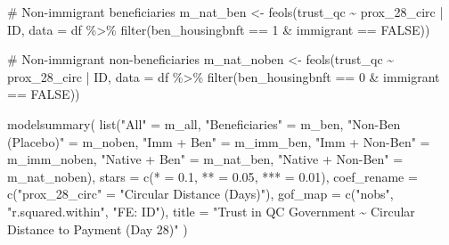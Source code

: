 \documentclass[
  letterpaper,
  DIV=11,
  numbers=noendperiod]{scrartcl}
\newenvironment{Shaded}{\begin{snugshade}}{\end{snugshade}}
\newcommand{\AttributeTok}[1]{\textcolor[rgb]{0.40,0.45,0.13}{#1}}
\newcommand{\CommentTok}[1]{\textcolor[rgb]{0.37,0.37,0.37}{#1}}
\newcommand{\ConstantTok}[1]{\textcolor[rgb]{0.56,0.35,0.01}{#1}}
\newcommand{\DecValTok}[1]{\textcolor[rgb]{0.68,0.00,0.00}{#1}}
\newcommand{\FloatTok}[1]{\textcolor[rgb]{0.68,0.00,0.00}{#1}}
\newcommand{\FunctionTok}[1]{\textcolor[rgb]{0.28,0.35,0.67}{#1}}
\newcommand{\NormalTok}[1]{\textcolor[rgb]{0.00,0.23,0.31}{#1}}
\newcommand{\OtherTok}[1]{\textcolor[rgb]{0.00,0.23,0.31}{#1}}
\newcommand{\SpecialCharTok}[1]{\textcolor[rgb]{0.37,0.37,0.37}{#1}}
\newcommand{\StringTok}[1]{\textcolor[rgb]{0.13,0.47,0.30}{#1}}
\begin{document}
\begin{Shaded}
\begin{Highlighting}[]
\CommentTok{\# Non{-}immigrant beneficiaries}
\NormalTok{m\_nat\_ben }\OtherTok{\textless{}{-}} \FunctionTok{feols}\NormalTok{(trust\_qc }\SpecialCharTok{\textasciitilde{}}\NormalTok{ prox\_28\_circ }\SpecialCharTok{|}\NormalTok{ ID,}
                   \AttributeTok{data =}\NormalTok{ df }\SpecialCharTok{\%\textgreater{}\%} \FunctionTok{filter}\NormalTok{(ben\_housingbnft }\SpecialCharTok{==} \DecValTok{1} \SpecialCharTok{\&}\NormalTok{ immigrant }\SpecialCharTok{==} \ConstantTok{FALSE}\NormalTok{))}

\CommentTok{\# Non{-}immigrant non{-}beneficiaries}
\NormalTok{m\_nat\_noben }\OtherTok{\textless{}{-}} \FunctionTok{feols}\NormalTok{(trust\_qc }\SpecialCharTok{\textasciitilde{}}\NormalTok{ prox\_28\_circ }\SpecialCharTok{|}\NormalTok{ ID,}
                     \AttributeTok{data =}\NormalTok{ df }\SpecialCharTok{\%\textgreater{}\%} \FunctionTok{filter}\NormalTok{(ben\_housingbnft }\SpecialCharTok{==} \DecValTok{0} \SpecialCharTok{\&}\NormalTok{ immigrant }\SpecialCharTok{==} \ConstantTok{FALSE}\NormalTok{))}

\FunctionTok{modelsummary}\NormalTok{(}
  \FunctionTok{list}\NormalTok{(}\StringTok{"All"} \OtherTok{=}\NormalTok{ m\_all,}
       \StringTok{"Beneficiaries"} \OtherTok{=}\NormalTok{ m\_ben,}
       \StringTok{"Non{-}Ben (Placebo)"} \OtherTok{=}\NormalTok{ m\_noben,}
       \StringTok{"Imm + Ben"} \OtherTok{=}\NormalTok{ m\_imm\_ben,}
       \StringTok{"Imm + Non{-}Ben"} \OtherTok{=}\NormalTok{ m\_imm\_noben,}
       \StringTok{"Native + Ben"} \OtherTok{=}\NormalTok{ m\_nat\_ben,}
       \StringTok{"Native + Non{-}Ben"} \OtherTok{=}\NormalTok{ m\_nat\_noben),}
  \AttributeTok{stars =} \FunctionTok{c}\NormalTok{(}\StringTok{\textquotesingle{}*\textquotesingle{}} \OtherTok{=} \FloatTok{0.1}\NormalTok{, }\StringTok{\textquotesingle{}**\textquotesingle{}} \OtherTok{=} \FloatTok{0.05}\NormalTok{, }\StringTok{\textquotesingle{}***\textquotesingle{}} \OtherTok{=} \FloatTok{0.01}\NormalTok{),}
  \AttributeTok{coef\_rename =} \FunctionTok{c}\NormalTok{(}\StringTok{"prox\_28\_circ"} \OtherTok{=} \StringTok{"Circular Distance (Days)"}\NormalTok{),}
  \AttributeTok{gof\_map =} \FunctionTok{c}\NormalTok{(}\StringTok{"nobs"}\NormalTok{, }\StringTok{"r.squared.within"}\NormalTok{, }\StringTok{"FE: ID"}\NormalTok{),}
  \AttributeTok{title =} \StringTok{"Trust in QC Government \textasciitilde{} Circular Distance to Payment (Day 28)"}
\NormalTok{)}
\end{Highlighting}
\end{Shaded}
\end{document}
